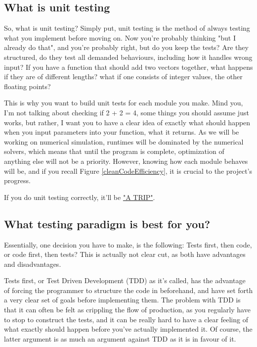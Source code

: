 \documentclass[10pt,a4paper]{article}
\begin{document}
\subsection{What is unit testing}
So, what is unit testing? Simply put, unit testing is the method of always testing what you implement before moving on. Now you're probably thinking "but I already do that", and you're probably right, but do you keep the tests? Are they structured, do they test all demanded behaviours, including how it handles wrong input? If you have a function that should add two vectors together, what happens if they are of different lengths? what if one consists of integer values, the other floating points? 

This is why you want to build unit tests for each module you make. Mind you, I'm not talking about checking if 2 + 2 = 4, some things you should assume just works, but rather, I want you to have a clear idea of exactly what should happen when you input parameters into your function, what it returns. As we will be working on numerical simulation, runtimes will be dominated by the numerical solvers, which means that until the program is complete, optimization of anything else will not be a priority. However, knowing how each module behaves will be, and if you recall Figure \ref{cleanCodeEfficiency}, it is crucial to the project's progress. 

If you do unit testing correctly, it'll be \href{http://stackoverflow.com/questions/61400/what-makes-a-good-unit-test}{"A TRIP"}.

\subsection{What testing paradigm is best for you?}

Essentially, one decision you have to make, is the following: Tests first, then code, or code first, then tests? This is actually not clear cut, as both have advantages and disadvantages. 

Tests first, or Test Driven Development (TDD) as it's called, has the advantage of forcing the programmer to structure the code in beforehand, and have set forth a very clear set of goals before implementing them. The problem with TDD is that it can often be felt as crippling the flow of production, as you regularly have to stop to construct the tests, and it can be really hard to have a clear feeling of what exactly should happen before you've actually implemented it. Of course, the latter argument is as much an argument against TDD as it is in favour of it.
\end{document}
